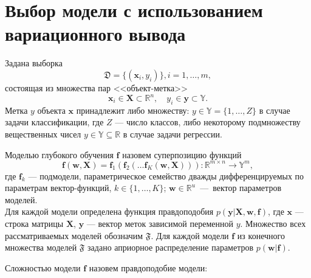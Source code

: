 \newpage{}
\chapter*{Выбор модели с использованием вариационного вывода}
Задана выборка  \begin{equation}\label{eq:dataset}\mathfrak{D} = \{(\mathbf{x}_i,y_i)\}, i = 1,\dots,m,\end{equation} состоящая из множества пар <<объект-метка>> $$\mathbf{x}_i \in \mathbf{X} \subset \mathbb{R}^n, \quad {y}_i \in \mathbf{y} \subset \mathbb{Y}.$$ Метка ${y}$  объекта $\mathbf{x}$ принадлежит либо множеству: ${y} \in \mathbb{Y} = \{1, \dots, Z\}$ в случае задачи классификации, где $Z$ --- число классов, либо некоторому подмножеству вещественных чисел ${y} \in \mathbb{Y}  \subseteq \mathbb{R}$ в случае задачи регрессии.

Моделью глубокого обучения $\mathbf{f}$ назовем суперпозицию функций
\begin{equation}
\label{eq:main}
 \mathbf{f}(\mathbf{w}, \mathbf{X}) = \mathbf{f}_1(\mathbf{f}_2(\dots \mathbf{f}_K(\mathbf{w}, \mathbf{X}))): \mathbb{R}^{m \times n} \to \mathbb{Y}^m,
\end{equation}
где $\mathbf{f}_k$ --- подмодели, параметрическое семейство дважды дифференцируемых по параметрам вектор-функций, $k \in \{1,\dots,K\}$; $\mathbf{w} \in \mathbb{R}^u$~---~вектор параметров моделей.\\
Для каждой модели определена функция правдоподобия  $p(\mathbf{y}|\mathbf{X}, \mathbf{w}, \mathbf{f})$, где $\mathbf{x}$ --- строка матрицы $\mathbf{X}$, $\mathbf{y}$ --- вектор меток зависимой переменной $y$.
Множество всех рассматриваемых моделей обозначим $\mathfrak{F}$. Для каждой модели $\mathbf{f}$ из конечного множества моделей $\mathfrak{F}$ задано априорное распределение параметров $p(\mathbf{w}|\mathbf{f})$.

Сложностью модели $\mathbf{f}$ назовем правдоподобие модели: %

